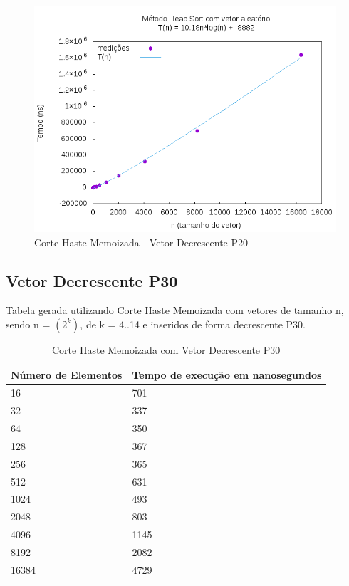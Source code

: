 \documentclass[12pt,a4paper,twoside]{report}
\begin{document}
\begin{figure}[H]
    \centering
    \includegraphics[width=0.7\linewidth]{graficos/HeapSort/vIntAleatorio/vIntAleatorio.png}
  \caption{Corte Haste Memoizada - Vetor Decrescente P20}
\end{figure}



\subsection{Vetor Decrescente P30}
Tabela gerada utilizando Corte Haste Memoizada com vetores de tamanho n, sendo n = $(2^k)$, de k = 4..14 e inseridos de forma decrescente P30.
\begin{table}[H]
\centering
\caption{Corte Haste Memoizada com Vetor Decrescente P30}
\label{my-label}
\begin{tabular}{|l|l|}
\hline
\multicolumn{1}{|c|}{\textbf{Número de Elementos}} & \multicolumn{1}{c|}{\textbf{Tempo de execução em nanosegundos}} \\ \hline
16 & 701 \\ \hline
32 & 337 \\ \hline
64 & 350 \\ \hline
128 & 367 \\ \hline
256 & 365 \\ \hline
512 & 631 \\ \hline
1024 & 493 \\ \hline
2048 & 803 \\ \hline
4096 & 1145 \\ \hline
8192 & 2082 \\ \hline
16384 & 4729 \\ \hline

\end{tabular}
\end{table}
\end{document}
